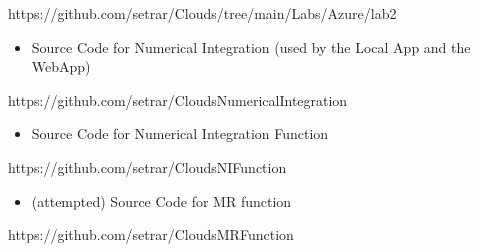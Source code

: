 \documentclass[11pt]{article}
\makeatletter
\providecommand{\tightlist}{%
      \setlength{\itemsep}{0pt}\setlength{\parskip}{0pt}}
\newcommand{\boxspacing}{\kern\kvtcb@left@rule\kern\kvtcb@boxsep}
\newcommand{\prompt}[4]{
        {\ttfamily\llap{{\color{#2}[#3]:\hspace{3pt}#4}}\vspace{-\baselineskip}}
    }
\makeatother
\begin{document}
https://github.com/setrar/Clouds/tree/main/Labs/Azure/lab2

\begin{itemize}
\tightlist
\item
  Source Code for Numerical Integration (used by the Local App and the
  WebApp)
\end{itemize}

https://github.com/setrar/CloudsNumericalIntegration

\begin{itemize}
\tightlist
\item
  Source Code for Numerical Integration Function
\end{itemize}

https://github.com/setrar/CloudsNIFunction

\begin{itemize}
\tightlist
\item
  (attempted) Source Code for MR function
\end{itemize}

https://github.com/setrar/CloudsMRFunction

    

    \begin{tcolorbox}[breakable, size=fbox, boxrule=1pt, pad at break*=1mm,colback=cellbackground, colframe=cellborder]
\prompt{In}{incolor}{ }{\boxspacing}
\begin{Verbatim}[commandchars=\\\{\}]

\end{Verbatim}
\end{tcolorbox}


    
    
    
\end{document}
